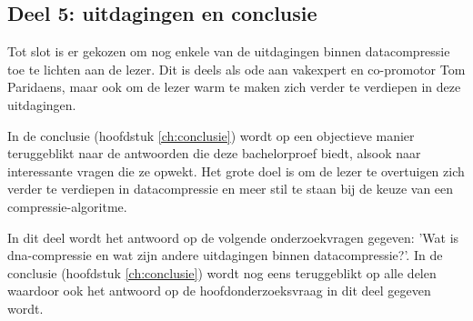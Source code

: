 \subsection{Deel 5: uitdagingen en conclusie}
\label{sec:aanpak-bachelorproef-deel-5}

Tot slot is er gekozen om nog enkele van de uitdagingen binnen \gls{datacompressie} toe te lichten aan de lezer. Dit is deels als ode aan vakexpert en co-promotor Tom Paridaens, maar ook om de lezer warm te maken zich verder te verdiepen in deze uitdagingen.

In de conclusie (hoofdstuk \ref{ch:conclusie}) wordt op een objectieve manier teruggeblikt naar de antwoorden die deze bachelorproef biedt, alsook naar interessante vragen die ze opwekt. Het grote doel is om de lezer te overtuigen zich verder te verdiepen in \gls{datacompressie} en meer stil te staan bij de keuze van een \gls{compressie-algoritme}.

In dit deel wordt het antwoord op de volgende onderzoekvragen gegeven: 'Wat is \gls{dna-compressie} en wat zijn andere uitdagingen binnen \gls{datacompressie}?'. In de conclusie (hoofdstuk \ref{ch:conclusie}) wordt nog eens teruggeblikt op alle delen waardoor ook het antwoord op de hoofdonderzoeksvraag in dit deel gegeven wordt.